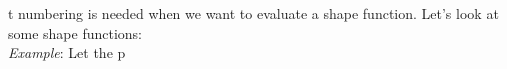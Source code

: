 \documentclass[a4paper,12pt]{article}
\begin{document}
t numbering is needed when we want to evaluate a shape function. Let's look at some shape functions:\\
\textit{Example}: Let the p
\end{document}
